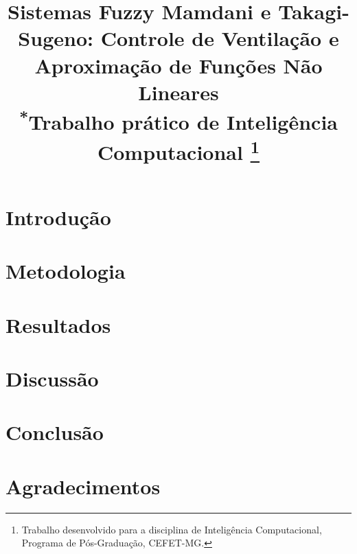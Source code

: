 \documentclass[conference]{IEEEtran}
\begin{document}
\title{Sistemas Fuzzy Mamdani e Takagi-Sugeno: Controle de Ventilação e Aproximação de Funções Não Lineares\\
{\footnotesize \textsuperscript{*}Trabalho prático de Inteligência Computacional}
\thanks{Trabalho desenvolvido para a disciplina de Inteligência Computacional, Programa de Pós-Graduação, CEFET-MG.}
}

\author{
}

\maketitle

\begin{abstract}

\end{abstract}

\begin{IEEEkeywords}

\end{IEEEkeywords}

\section{Introdução}


\section{Metodologia}


\section{Resultados}


\section{Discussão}


\section{Conclusão}


\section*{Agradecimentos}




\end{document}
